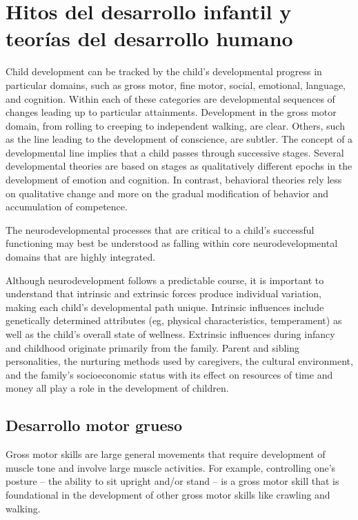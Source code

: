 \section{Hitos del desarrollo infantil y teorías del desarrollo humano}

Child development can be tracked by the child’s developmental progress in
particular domains, such as gross motor, fine motor, social, emotional,
language, and cognition. Within each of these categories are  developmental
sequences of changes leading up to particular attainments. Development in the
gross motor domain, from rolling to creeping to independent walking, are clear.
Others, such as the line leading to the development of conscience, are subtler.
The concept of a developmental line implies that a child passes through
successive stages. Several developmental theories are based on stages as
qualitatively different epochs in the development of emotion and cognition. In
contrast, behavioral theories rely less on qualitative change and more on the
gradual modification of behavior and accumulation of competence.
\cite{Nelson19}

The neurodevelopmental processes that are critical to a child’s successful
functioning may best be understood as falling within core neurodevelopmental
domains that are highly integrated.

Although neurodevelopment follows a predictable course, it is important to
understand that intrinsic and extrinsic forces produce individual variation,
making each child’s developmental path unique. Intrinsic influences include
genetically determined attributes (eg, physical characteristics, temperament)
as well as the child’s overall state of wellness. Extrinsic influences during
infancy and childhood originate primarily from the family. Parent and sibling
personalities, the nurturing methods used by caregivers, the cultural
environment, and the family’s socioeconomic status with its effect on resources
of time and money all play a role in the development of children.
\cite{Gerber2010}

\subsection {Desarrollo motor grueso}
Gross motor skills are large general movements that require development of
muscle tone and involve large muscle activities. For example, controlling one’s
posture – the ability to sit upright and/or stand – is a gross motor skill that
is foundational in the development of other gross motor skills like crawling
and walking. \cite{Lorentz2021}

